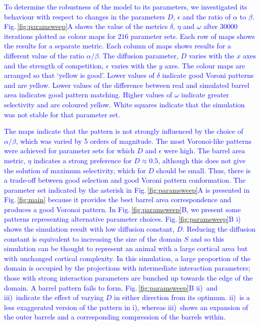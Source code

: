 \documentclass[9pt,lineno,draft]{elife}
\newcommand{\cmnt}[1]{\textcolor{blue}{#1}}
\begin{document}
\cmnt{To determine the robustness of the model to its parameters, we
  investigated its behaviour with respect to changes in the parameters $D$,
  $\epsilon$ and the ratio of $\alpha$ to $\beta$. Fig.\,\ref{fig:paramsweep}A
  shows the value of the metrics $\delta$, $\eta$ and $\omega$ after $30000$
  iterations plotted as colour maps for $216$ parameter sets. Each row of maps
  shows the results for a separate metric. Each column of maps shows
  results for a different value of the ratio $\alpha / \beta$. The diffusion
  parameter, $D$ varies with the $x$ axes and the strength of competition,
  $\epsilon$ varies with the $y$ axes. The colour maps are arranged so that
  `yellow is good'. Lower values of $\delta$ indicate good Voroni patterns and
  are yellow. Lower values of the difference between real and simulated barrel
  area indicates good pattern matching. Higher values of $\omega$ indicate
  greater selectivity and are coloured yellow. White squares indicate that the
  simulation was not stable for that parameter set.}

\cmnt{The maps indicate that the pattern is not strongly influenced by the
  choice of $\alpha/\beta$, which was varied by 5 orders of magnitude. The
  most Voronoi-like patterns were achieved for parameter sets for which $D$
  and $\epsilon$ were high. The barrel area metric, $\eta$ indicates a strong
  preference for $D\approx0.5$, although this does not give the
  solution of maximum selectivity, which for $D$ should be small. Thus, there is a
  trade-off between good selection and good Voroni pattern
  conformation. The
  parameter set indicated by the asterisk in
  Fig.\,\ref{fig:paramsweep}A is presented in Fig.\,\ref{fig:main} because it
  provides the best barrel area correspondence and produces a good Voronoi
  pattern. In Fig.\,\ref{fig:paramsweep}B, we present some patterns
  representing alternative parameter choices. Fig.\,\ref{fig:paramsweep}B i)
  shows the simulation result with low diffusion constant, $D$. Reducing the
  diffusion constant is equivalent to increasing the size of the domain $S$
  and so this simulation can be thought to represent an animal with a large
  cortical area but with unchanged cortical complexity. In this simulation, a
  large proportion of the domain is occupied by the projections with
  intermediate interaction parameters; those with strong interaction
  parameters are bunched up towards the edge of the domain. A barrel pattern
  fails to form. Fig.\,\ref{fig:paramsweep}B ii)~and iii)~indicate the effect
  of varying $D$ in either direction from its optimum. ii)~is a less
  exaggerated version of the pattern in i), whereas iii)~shows an expansion of
  the outer barrels and a corresponding compression of the barrels within.}
\end{document}
